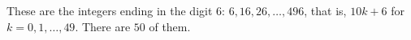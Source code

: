 These are the integers ending in the digit $6$: $6,16,26,\dots,496$, that is, $10k+6$ for $k=0,1,\dots,49$. There are $\boxed{50}$ of them.
